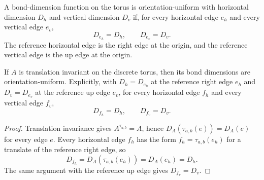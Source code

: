 \begin{definition}%
    \label{def:peps_torus_uniform_bond_dim}
    \leanok
    A bond-dimension function on the torus is orientation-uniform with
    horizontal dimension $D_h$ and vertical dimension $D_v$ if, for every
    horizontal edge $e_h$ and every vertical edge $e_v$,
    \[
        D_{e_h}=D_h,
        \qquad
        D_{e_v}=D_v.
    \]
    The reference horizontal edge is the right edge at the origin, and the
    reference vertical edge is the up edge at the origin.
\end{definition}

\begin{theorem}%
    \label{thm:peps_torusUniformBondDim_of_translationInvariant}
    \leanok
    If $A$ is translation invariant on the discrete torus, then its bond
    dimensions are orientation-uniform. Explicitly, with
    $D_h=D_{e_h}$ at the reference right edge $e_h$ and
    $D_v=D_{e_v}$ at the reference up edge $e_v$, for every horizontal
    edge $f_h$ and every vertical edge $f_v$,
    \[
        D_{f_h}=D_h,
        \qquad
        D_{f_v}=D_v.
    \]
\end{theorem}
\begin{proof}\leanok
    Translation invariance gives $A^{\tau_{a,b}}=A$, hence
    $D_A(\tau_{a,b}(e))=D_A(e)$ for every edge $e$. Every horizontal edge
    $f_h$ has the form $f_h=\tau_{a,b}(e_h)$ for a translate of the reference
    right edge, so
    \[
        D_{f_h}
        =
        D_A(\tau_{a,b}(e_h))
        =
        D_A(e_h)
        =
        D_h.
    \]
    The same argument with the reference up edge gives $D_{f_v}=D_v$.
\end{proof}


